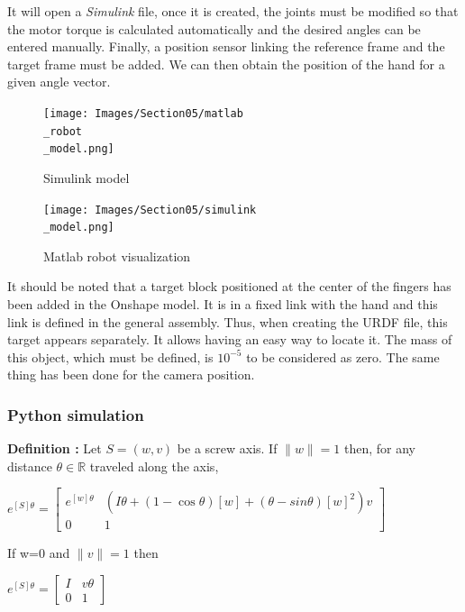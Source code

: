\bigbreak
It will open a \textit{Simulink} file, once it is created, the joints must be modified so that the motor torque is calculated automatically and the desired angles can be entered manually. Finally, a position sensor linking the reference frame and the target frame must be added. We can then obtain the position of the hand for a given angle vector. 

\bigbreak
\begin{figure}[ht]
    \centering
    \texttt{[image: Images/Section05/matlab\\\_robot\\\_model.png]}
    \caption{Simulink model}
    \label{fig:Simulink}
\end{figure}
\FloatBarrier

\bigbreak
\begin{figure}[ht]
    \centering
    \texttt{[image: Images/Section05/simulink\\\_model.png]}
    \caption{Matlab robot visualization}
    \label{fig:MatlabRobot}
\end{figure}
\FloatBarrier

\bigbreak
It should be noted that a target block positioned at the center of the fingers has been added in the Onshape model. It is in a fixed link with the hand and this link is defined in the general assembly. Thus, when creating the URDF file, this target appears separately. It allows having an easy way to locate it. The mass of this object, which must be defined, is $10^{-5}$ to be considered as zero. The same thing has been done for the camera position. 

\subsubsection{Python simulation}

\textbf{Definition :} Let $S = (w,v)$ be a screw axis. If $\|w\|=1$ then, for any distance $\theta\in\mathbb{R}$ traveled along the axis,
\begin{center}
    $e^{[S]\theta}=
    \begin{bmatrix}
        e^{[w]\theta} & (I\theta+(1-\cos\theta)[w]+(\theta-sin\theta)[w]^2)v\\
        0 & 1
    \end{bmatrix}$
\end{center}
If w=0 and $\|v\|=1$ then 
\begin{center}
    $e^{[S]\theta}=\begin{bmatrix}
        I & v\theta\\
        0 & 1
    \end{bmatrix}$
\end{center}

